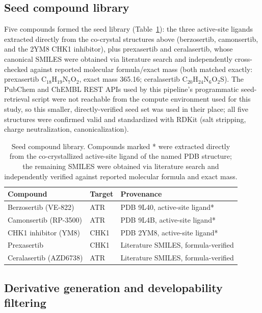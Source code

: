 \documentclass[11pt]{article}
\begin{document}
\subsection*{Seed compound library}

Five compounds formed the seed library (Table~\ref{tab:seeds}): the three
active-site ligands extracted directly from the co-crystal structures above
(berzosertib, camonsertib, and the 2YM8 CHK1 inhibitor), plus prexasertib
and ceralasertib, whose canonical SMILES were obtained via literature search
and independently cross-checked against reported molecular
formula/exact mass (both matched exactly: prexasertib
C$_{18}$H$_{19}$N$_7$O$_2$, exact mass 365.16; ceralasertib
C$_{20}$H$_{24}$N$_6$O$_2$S). The PubChem and ChEMBL REST APIs used by this
pipeline's programmatic seed-retrieval script were not reachable from the
compute environment used for this study, so this smaller, directly-verified
seed set was used in their place; all five structures were confirmed valid
and standardized with RDKit \citep{rdkit} (salt stripping, charge
neutralization, canonicalization).

\begin{table}[htbp]
\centering
\caption{Seed compound library. Compounds marked * were extracted directly from the co-crystallized active-site ligand of the named PDB structure; the remaining SMILES were obtained via literature search and independently verified against reported molecular formula and exact mass.}
\label{tab:seeds}
\small
\begin{tabular}{lll}
\toprule
Compound & Target & Provenance \\
\midrule
Berzosertib (VE-822)   & ATR  & PDB 9L40, active-site ligand* \\
Camonsertib (RP-3500)  & ATR  & PDB 9L4B, active-site ligand* \\
CHK1 inhibitor (YM8)   & CHK1 & PDB 2YM8, active-site ligand* \\
Prexasertib            & CHK1 & Literature SMILES, formula-verified \\
Ceralasertib (AZD6738) & ATR  & Literature SMILES, formula-verified \\
\bottomrule
\end{tabular}
\end{table}

\subsection*{Derivative generation and developability filtering}
\end{document}
